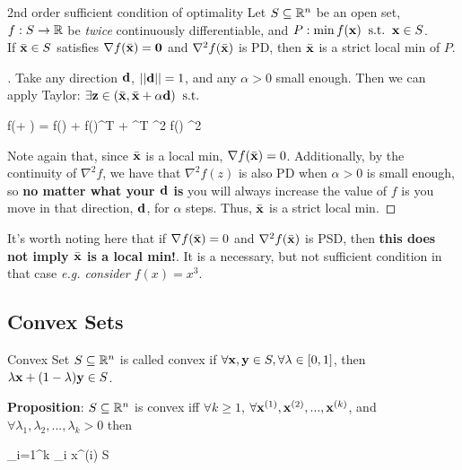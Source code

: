 \begin{theo}{2nd order sufficient condition of optimality}{}
Let $S \subseteq \mathbb{R}^n$ be an open set, $f:S \rightarrow \mathbb{R}$ be \textit{twice} 
continuously differentiable, and $P : \min f(\mathbf{x}) \;\; \text{s.t.} \;\; \mathbf{x} \in S$.
\bigskip\\
If $\bar{\mathbf{x}} \in S$ satisfies $\nabla f(\bar{\mathbf{x}}) = \mathbf{0}$ and $\nabla^2 f(\bar{\mathbf{x}})$ is PD, 
then $\bar{\mathbf{x}}$ is a strict local min of $P$.
\end{theo}

\begin{proof}[]
Take any direction $\mathbf{d}$, $||\mathbf{d}|| = 1$, and any $\alpha > 0$ small enough.
Then we can apply Taylor: $\exists \mathbf{z} \in (\bar{\mathbf{x}}, \bar{\mathbf{x}} + \alpha \mathbf{d}) \;\; \text{s.t.} \;\;$
\begin{frml}
	f(\bx + \alpha \vd) = f(\bx) + \nabla f(\bx)^T \vd \alpha +  
	\vd^T \nabla^2 f(\vz) \vd \alpha^2
\end{frml}
Note again that, since $\bar{\mathbf{x}}$ is a local min, $\nabla f(\bar{\mathbf{x}}) = 0$. Additionally,
by the continuity of $\nabla^2 f$, we have that $\nabla^2 f(z)$ is also PD when
$\alpha > 0$ is small enough, so \textbf{no matter what your $\mathbf{d}$ is} you will
always increase the value of $f$ is you move in that direction, $\mathbf{d}$, for 
$\alpha$ steps.  Thus, $\bar{\mathbf{x}}$ is a strict local min.
\end{proof}

It's worth noting here that if $\nabla f(\bar{\mathbf{x}}) = 0$ and $\nabla^2 f(\bar{\mathbf{x}})$ is PSD,
then \textbf{this does not imply $\bar{\mathbf{x}}$ is a local min!}. It is a necessary, but
not sufficient condition in that case \textit{e.g. consider $f(x) = x^3$}.

\subsection{Convex Sets}

\begin{defn}{Convex Set}{}
$S \subseteq \mathbb{R}^n$ is called convex if $\forall \mathbf{x}, \mathbf{y} \in S, \forall \lambda 
\in [0, 1]$,
then $\lambda \mathbf{x} + (1 - \lambda) \mathbf{y} \in S$.
\end{defn}

\begin{prop}{}{}
\textbf{Proposition}: $S \subseteq \mathbb{R}^n$ is convex iff $\forall k \geq 1$,
$\forall \mathbf{x}^{(1)}, \mathbf{x}^{(2)}, ... , \mathbf{x}^{(k)}$, and $\forall \lambda_1, 
\lambda_2, ..., \lambda_k > 0$ then
\begin{frml}
	\sum_{i=1}^k \lambda_i x^{(i)} \in S
\end{frml}
\end{prop}

